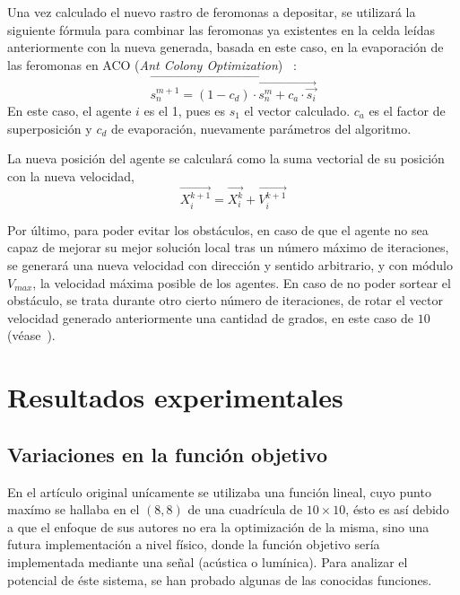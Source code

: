 \documentclass[runningheads]{llncs}
\begin{document}
    Una vez calculado el nuevo rastro de feromonas a depositar, se utilizará la siguiente fórmula para combinar las feromonas ya existentes en la celda leídas anteriormente con la nueva generada, basada en este caso, en la evaporación de las feromonas en ACO (\textit{Ant Colony Optimization}) ~\cite{ACO}:
    \[
        \vec{s_n^{m+1}=(1-c_d)\cdot\vec{s_n^m+c_a\cdot\vec{s_i}}}
    \]
    En este caso, el agente $i$ es el 1, pues es $s_1$ el vector calculado. $c_a$ es el factor de superposición y $c_d$ de evaporación, nuevamente parámetros del algoritmo.

    La nueva posición del agente se calculará como la suma vectorial de su posición con la nueva velocidad,
    \[  \vec{ X_i^{k+1} } = \vec{X_i^k} + \vec{ V_i^{k+1} }  \]

    Por último, para poder evitar los obstáculos, en caso de que el agente no sea capaz de mejorar su mejor solución local tras un número máximo de iteraciones, se generará una nueva velocidad con dirección y sentido arbitrario, y con módulo $V_{max}$, la velocidad máxima posible de los agentes. En caso de no poder sortear el obstáculo, se trata durante otro cierto número de iteraciones, de rotar el vector velocidad generado anteriormente una cantidad de grados, en este caso de $10$ (véase~\cite{referencedPaper}).


    \section{Resultados experimentales}



    \subsection{Variaciones en la función objetivo}
    En el artículo original \cite{initialPaper} unícamente se utilizaba una función lineal, cuyo punto maxímo se hallaba en el $(8,8)$ de una cuadrícula de $10\times10$, ésto es así debido a que el enfoque de sus autores no era la optimización de la misma, sino una futura implementación a nivel físico, donde la función objetivo sería implementada mediante una señal (acústica o lumínica). Para analizar el potencial de éste sistema, se han probado algunas de las conocidas funciones.
\end{document}
